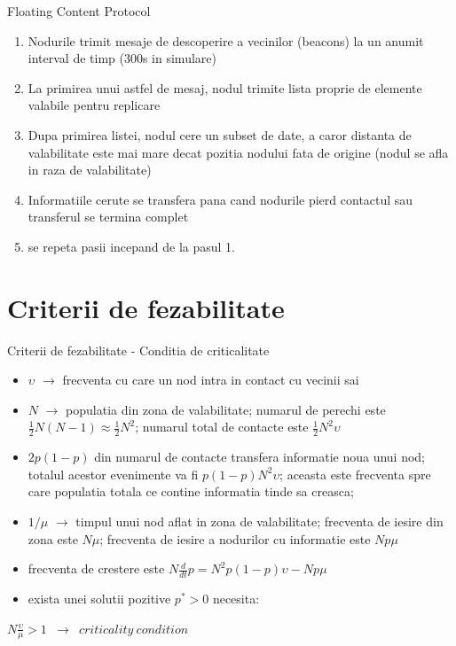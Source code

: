 \documentclass{beamer}
\begin{document}
\begin{frame}{Floating Content Protocol}
	\begin{enumerate}
	  \item Nodurile trimit mesaje de descoperire a vecinilor (beacons) la un
	  anumit interval de timp (300s in simulare)
	  \item La primirea unui astfel de mesaj, nodul trimite lista proprie de
	  elemente valabile pentru replicare
	  \item Dupa primirea listei, nodul cere un subset de date, a caror distanta de
	  valabilitate este mai mare decat pozitia nodului fata de origine (nodul se
	  afla in raza de valabilitate)
	  \item Informatiile cerute se transfera pana cand nodurile pierd contactul sau
	  transferul se termina complet
	  \item se repeta pasii incepand de la pasul 1.
	\end{enumerate}
\end{frame}


\section {Criterii de fezabilitate}
\begin{frame}{Criterii de fezabilitate - Conditia de criticalitate}
	\begin{itemize}
	  \item $\upsilon$ $\rightarrow$ frecventa cu care un nod intra in contact cu
	  vecinii sai
	  \item $N$ $\rightarrow$ populatia din zona de valabilitate; numarul de
	  perechi este $\frac{1}{2}N(N-1) \approx \frac{1}{2}N^2$; numarul total de
	  contacte este $\frac{1}{2}N^2\upsilon$
	  \item $2p(1-p)$ din numarul de contacte transfera informatie noua unui nod;
	  totalul acestor evenimente va fi $p(1-p)N^2\upsilon$; aceasta este frecventa
	  spre care populatia totala ce contine informatia tinde sa creasca;  
	  \item $1/\mu$ $\rightarrow$ timpul unui nod aflat in zona de valabilitate;
	  frecventa de iesire din zona este $N\mu$; frecventa de iesire a nodurilor cu
	  informatie este $Np\mu$
	  \item frecventa de crestere este $N\frac{d}{dt}p = N^2p(1-p)\upsilon - Np\mu$
	  \item exista unei solutii pozitive $p^* > 0$ necesita:
	\end{itemize}
	\hskip0.5in
	\small{
		\begin{beamerboxesrounded}[lower=block body,shadow=true,width=3.2in]{}
			\begin{center}
				\texttt{$N\frac{\upsilon}{\mu} > 1$ $\rightarrow$ $criticality\ condition$}
			\end{center}
		\end{beamerboxesrounded}
	}
\end{frame}
\end{document}
